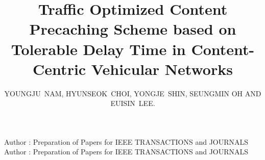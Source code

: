 \documentclass{ieeeaccess}
\begin{document}

\title{Traffic Optimized Content Precaching Scheme based on Tolerable Delay Time in Content-Centric Vehicular Networks}
\author{\uppercase{Youngju~Nam}, %
\uppercase{Hyunseok~Choi, Yongje~Shin, Seungmin Oh  and Euisin~Lee}.
}

\address[1]{Research Institute for Computer and Information Communication, Chungbuk National University, Cheongju 28644, Republic of Korea (e-mail: imnyj@chungbuk.ac.kr; hschoi@chungbuk.ac.kr; yjshin@chungbuk.ac.kr)}
\address[2]{Department of Computer Science and Engineering, Kongju National University, Cheonan 31080, South Korea (e-mail: smoh@kongju.ac.kr)}
\address[3]{School of Information Communication Engineering, Chungbuk National University, Cheongju 28644 Republic of Korea}

\markboth
{Author \headeretal: Preparation of Papers for IEEE TRANSACTIONS and JOURNALS}
{Author \headeretal: Preparation of Papers for IEEE TRANSACTIONS and JOURNALS}

\end{document}
